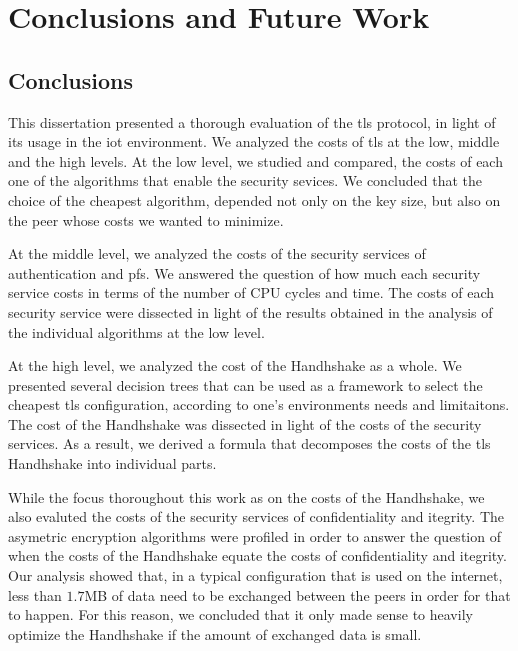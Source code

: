 
\chapter{Conclusions and Future Work}
\label{chapter:conclusions}

\section{Conclusions}

This dissertation presented a thorough evaluation of the \gls{tls} protocol, in light of its usage in the \gls{iot} environment. 
We analyzed the  costs of \gls{tls} at the low, middle and the high levels. At the low level, we studied and compared,
the costs of each one of the algorithms that enable the security sevices. We concluded that the choice
of the cheapest algorithm, depended not only on the key size, but also on the peer whose costs we wanted to
minimize. 

At the middle level, we analyzed the costs of the security services of authentication and \gls{pfs}.
We answered the question of how much each security service costs in terms of the number of CPU cycles and time.
The costs of each security service were dissected in light of the results obtained in the analysis of the
individual algorithms at the low level.

At the high level, we analyzed the cost of the Handhshake as a whole. We presented several decision trees that can be
used as a framework to select the cheapest \gls{tls} configuration, according to one's environments needs and limitaitons.
The cost of the Handhshake was dissected in light of the costs of the security services. As a result, we derived a formula
that decomposes the costs of the \gls{tls} Handhshake into individual parts.

While the focus thoroughout this work as on the costs of the Handhshake, we also evaluted the costs of the security services of
confidentiality and itegrity. The asymetric encryption algorithms were profiled in order to answer the question of when the costs
of the Handhshake equate the costs of confidentiality and itegrity. Our analysis showed that, in a typical configuration that is used
on the internet, less than $1.7$MB of data need to be exchanged between the peers in order for that to happen. For this reason, we 
concluded that it only made sense to heavily optimize the Handhshake if the amount of exchanged data is small.

